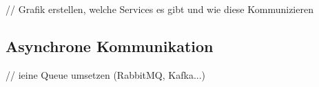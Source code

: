 // Grafik erstellen, welche Services es gibt und wie diese Kommunizieren 






\subsection{Asynchrone  Kommunikation}
// ieine Queue umsetzen (RabbitMQ, Kafka...)

